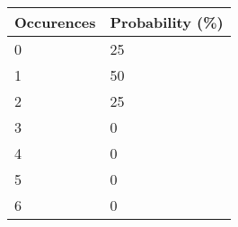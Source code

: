 \begin{tabular}{ll}
Occurences & Probability (\%) \\ 
\hline 
0 & 25 \\ 
1 & 50 \\ 
2 & 25 \\ 
3 & 0 \\ 
4 & 0 \\ 
5 & 0 \\ 
6 & 0 \\ 
\hline 
\end{tabular}